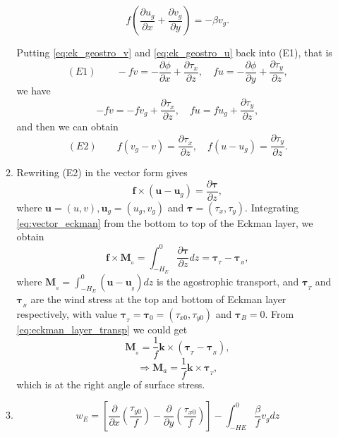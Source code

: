 \documentclass[a4paper]{article}
\begin{document}
\begin{enumerate}[label=\textbf{\arabic*.}]
\begin{enumerate}[label=\textbf{(\alph*)}]
			\begin{equation}\label{eq:eckman_geostrophic}
				f \left( \frac { \partial u_{ g } } { \partial x } + \frac { \partial v_{ g } } { \partial y } \right) = - \beta v_{ g }.
			\end{equation}
			
			Putting \eqref{eq:ek_geostro_v} and \eqref{eq:ek_geostro_u} back into (E1), that is 
				$$ (E1)\qquad -f v = -\frac { \partial \phi } { \partial x } + \frac { \partial \tau _ { x } } {\partial z } ,\quad f u = -\frac { \partial \phi } {\partial y } + \frac{ \partial \tau _ { y }} {\partial z },$$
			we have
			$$-f v = -fv_g + \frac { \partial \tau _ { x } } {\partial z } ,\quad f u = fu_g+ \frac{ \partial \tau _ { y }} {\partial z },$$
		    and then we can obtain
			$$ (E2)\qquad f\left( v_{g} - v \right) = \frac { \partial \tau _ { x } } { \partial z } ,\quad f \left(u - u_{g} \right) = \frac { \partial \tau _ {y} } {\partial z }.$$
			
			\item 
				
			Rewriting (E2) in the vector form gives
			\begin{equation}\label{eq:vector_eckman}
			\bm f\times (\bm u-\bm u_g) = \frac{\partial \bm\tau } { \partial z },
			\end{equation}
			where $\bm u=(u,v), \bm u_g=(u_g,v_g)$ and $ \bm \tau =(\tau_x, \tau_y)$.
			Integrating \eqref{eq:vector_eckman} from the bottom to top of the Eckman layer, we obtain
			\begin{equation}\label{eq:eckman_layer_transp}
			\bm f\times \bm M_{_a}=  \int_{-H_E}^{0} \frac{\partial \bm\tau } { \partial z }dz=\bm \tau_{_T}-\bm \tau_{_B},
			\end{equation} 
			where $\bm M_{_a}=\int_{-H_E}^{0} (\bm u -\bm u_{_g})dz$ is the agostrophic transport, and $\bm \tau_{_T}$ and $\bm \tau_{_B}$ are the wind stress at the top and bottom of Eckman layer respectively, with value $\bm \tau_{_T} = \bm \tau_0 = (\tau_{x0}, \tau_{y0})$ and $\bm \tau_B=0$. From \eqref{eq:eckman_layer_transp} we could get
			$$\bm M_{_a}= \frac{1}{f}\bm {k}\times (\bm \tau_{_T}-\bm \tau_{_B}),$$
			$$\Longrightarrow \bm M_{a}= \frac{1}{f}\bm {k}\times \bm \tau_{_T}, $$ which is at the right angle of surface stress.
			
			\item 
			$$w_{ E } = \left[ \frac { \partial } { \partial x } \left( \frac { \tau_{ y 0} } {f} \right) - \frac { \partial } { \partial y } \left( \frac { \tau_ { x0} } {f} \right) \right] - \int_{- HE }^{ 0} \frac { \beta } { f } v_{ g } d z$$
			

\end{enumerate}
\end{enumerate}
\end{document}

